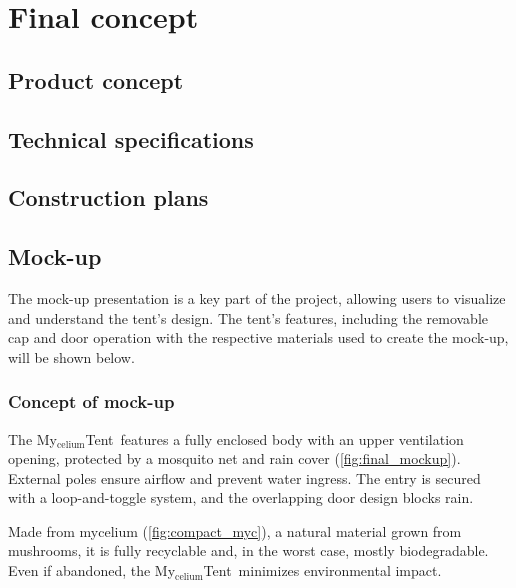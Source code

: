 \documentclass{article}
\newcommand{\myc}{My$_{\text{celium}}$Tent}
\begin{document}
\section{Final concept}

\subsection{Product concept}

\subsection{Technical specifications}

\subsection{Construction plans}

\subsection{Mock-up}
The mock-up presentation is a key part of the project, allowing users to visualize and
understand the tent's design. The tent's features, including the removable cap and door
operation with the respective materials used to create the mock-up, will be shown below.

\subsubsection{Concept of mock-up}
The \myc\ features a fully enclosed body with an upper ventilation opening, protected by a
mosquito net and rain cover (\autoref{fig:final_mockup}).\\
External poles ensure airflow and prevent water ingress. The entry is secured with a
loop-and-toggle system, and the overlapping door design blocks rain.

Made from mycelium (\autoref{fig:compact_myc}), a natural material grown from mushrooms,
it is fully recyclable and, in the worst case, mostly biodegradable. Even if abandoned,
the \myc\ minimizes environmental impact.

\newpage
\end{document}
